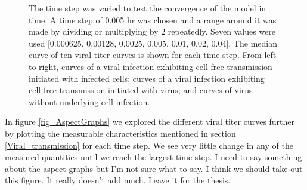 \begin{figure}
{    }

\caption{The time step was varied to test the convergence of the model in time. A time step of 0.005 hr was chosen and a range around it was made by dividing or multiplying by 2 repeatedly. Seven values were used [0.000625, 0.00128, 0.0025, 0.005, 0.01, 0.02, 0.04]. The median curve of ten viral titer curves is shown for each time step. From left to right, curves of a viral infection exhibiting cell-free transmission initiated with infected cells; curves of a viral infection exhibiting cell-free transmission initiated with virus; and curves of virus without underlying cell infection. \label{fig:ViralTiterCurves}}
\end{figure}

In figure \ref{fig_AspectGraphs} we explored the different viral titer curves further by plotting the measurable characteristics mentioned in section \ref{Viral_transmission} for each time step. We see very little change in any of the measured quantities until we reach the largest time step. \color{blue} I need to say something about the aspect graphs but I'm not sure what to say. \color{black} \color{red} I think we should take out this figure. It really doesn't add much. Leave it for the thesis.\color{black}

